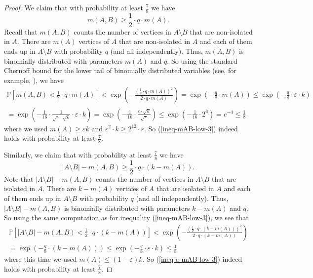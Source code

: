 \documentclass[11pt]{article}
\theoremstyle{definition}
\numberwithin{equation}{section}
\begin{document}
\begin{proof}
We claim that with probability at least $\frac{7}{8}$ we have
\begin{equation}\label{ineq-mAB-low-3}
m(A,B)\geq \frac{1}{2}\cdot q \cdot m(A).
\end{equation}
Recall that $m(A,B)$ counts the number of vertices in $A\setminus B$ that are non-isolated in $A$. There are $m(A)$ vertices of $A$ that are non-isolated in $A$ and each of them ends up in $A\setminus B$ with probability $q$ (and all independently). Thus, $m(A,B)$ is binomially distributed with parameters $m(A)$ and $q$. So using the standard Chernoff bound for the lower tail of binomially distributed variables (see, for example, \cite[Theorem A.1.13]{alon-spencer}), we have 
\begin{multline*}
\mathbb{P}\left[m(A,B)< \frac{1}{2}\cdot q \cdot m(A)\right]<\exp\left(-\frac{\left(\frac{1}{2}\cdot q \cdot m(A)\right)^2}{2\cdot q\cdot m(A)}\right)=\exp\left(-\frac{q}{8}\cdot m(A)\right)\leq \exp\left(-\frac{q}{8}\cdot \varepsilon\cdot k\right)\\
=\exp\left(-\frac{1}{16}\cdot \frac{1}{\sqrt{r}\cdot \sqrt{k}}\cdot \varepsilon\cdot k\right)=\exp\left(-\frac{1}{16}\cdot \frac{\varepsilon\cdot \sqrt{k}}{\sqrt{r}}\right)\leq \exp\left(-\frac{1}{16}\cdot 2^6\right)= e^{-4}\leq \frac{1}{8}
\end{multline*}
where we used $m(A)\geq \varepsilon k$ and $\varepsilon^2\cdot k\geq 2^{12} \cdot r$. So (\ref{ineq-mAB-low-3}) indeed holds with probability at least $\frac{7}{8}$.

Similarly, we claim that with probability at least $\frac{7}{8}$ we have
\begin{equation}\label{ineq-a-mAB-low-3}
\vert A\setminus B\vert-m(A,B)\geq \frac{1}{2}\cdot q \cdot (k-m(A)).
\end{equation}
Note that $\vert A\setminus B\vert-m(A,B)$ counts the number of vertices in $A\setminus B$ that are isolated in $A$. There are $k-m(A)$ vertices of $A$ that are isolated in $A$ and each of them ends up in $A\setminus B$ with probability $q$ (and all independently). Thus, $\vert A\setminus B\vert-m(A,B)$ is binomially distributed with parameters $k-m(A)$ and $q$. So using the same computation as for inequality (\ref{ineq-mAB-low-3}), we see that
\begin{multline*}
\mathbb{P}\left[\vert A\setminus B\vert-m(A,B)< \frac{1}{2}\cdot q \cdot (k-m(A))\right]<\exp\left(-\frac{\left(\frac{1}{2}\cdot q \cdot (k-m(A))\right)^2}{2\cdot q\cdot (k-m(A))}\right)\\
=\exp\left(-\frac{q}{8}\cdot (k-m(A))\right)\leq \exp\left(-\frac{q}{8}\cdot \varepsilon\cdot k\right)\leq \frac{1}{8}
\end{multline*}
where this time we used $m(A)\leq (1-\varepsilon) k$. So (\ref{ineq-a-mAB-low-3}) indeed holds with probability at least $\frac{7}{8}$.


\end{proof}
\end{document}
